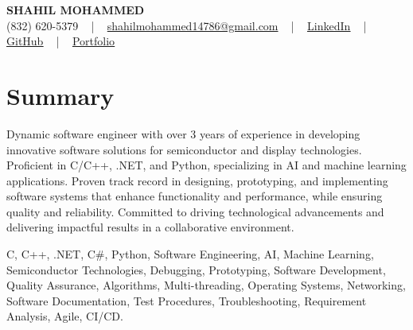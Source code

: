 \documentclass[letterpaper,10pt]{article}
\begin{document}
\begin{center}
    {\fontsize{14pt}{12pt}\selectfont \textbf{\MakeUppercase{Shahil Mohammed}}}\\ \vspace{2pt}
    \fontsize{10pt}{12pt}\selectfont (832) 620-5379 ~ | ~ \href{mailto:shahilmohammed14786@gmail.com}{shahilmohammed14786@gmail.com} ~ | ~  
    \href{https://www.linkedin.com/in/shahil-mohammed-9652931a1/}{\color{blue}\underline{LinkedIn}}  ~ | ~ 
    \href{https://github.com/freakbeast14}{\color{blue}\underline{GitHub}} ~ | ~ 
    \href{https://shahil-mohammed.netlify.app/}{\color{blue}\underline{Portfolio}}
    \vspace{-8pt}
\end{center}

\section{Summary}
\vspace{-2pt}\fontsize{8pt}{9pt}\selectfont
Dynamic software engineer with over 3 years of experience in developing innovative software solutions for semiconductor and display technologies. Proficient in C/C++, .NET, and Python, specializing in AI and machine learning applications. Proven track record in designing, prototyping, and implementing software systems that enhance functionality and performance, while ensuring quality and reliability. Committed to driving technological advancements and delivering impactful results in a collaborative environment.
 \vspace{-5pt}
 
{\fontsize{1pt}{1pt}\selectfont\color{white}
C, C++, .NET, C#, Python, Software Engineering, AI, Machine Learning, Semiconductor Technologies, Debugging, Prototyping, Software Development, Quality Assurance, Algorithms, Multi-threading, Operating Systems, Networking, Software Documentation, Test Procedures, Troubleshooting, Requirement Analysis, Agile, CI/CD.
}
\vspace{-8pt}

\vspace{-2pt}
\end{document}
